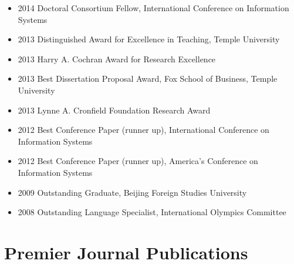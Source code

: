 \documentclass[paper=letter,fontsize=10pt]{scrartcl} %
\newcommand{\NewPart}[2]{\section*{{#1} #2}}
\begin{document}
\begin{itemize}
\item 2014 Doctoral Consortium Fellow, International Conference on Information Systems
\item 2013 Distinguished Award for Excellence in Teaching, Temple University
\item 2013 Harry A. Cochran Award for Research Excellence
\item 2013 Best Dissertation Proposal Award, Fox School of Business, Temple University
\item 2013 Lynne A. Cronfield Foundation Research Award
\item 2012 Best Conference Paper (runner up), International Conference on Information Systems
\item 2012 Best Conference Paper (runner up), America's Conference on Information Systems
\item 2009 Outstanding Graduate, Beijing Foreign Studies University
\item 2008 Outstanding Language Specialist, International Olympics Committee
\end{itemize}





\NewPart{Premier Journal Publications}{}
\end{document}
